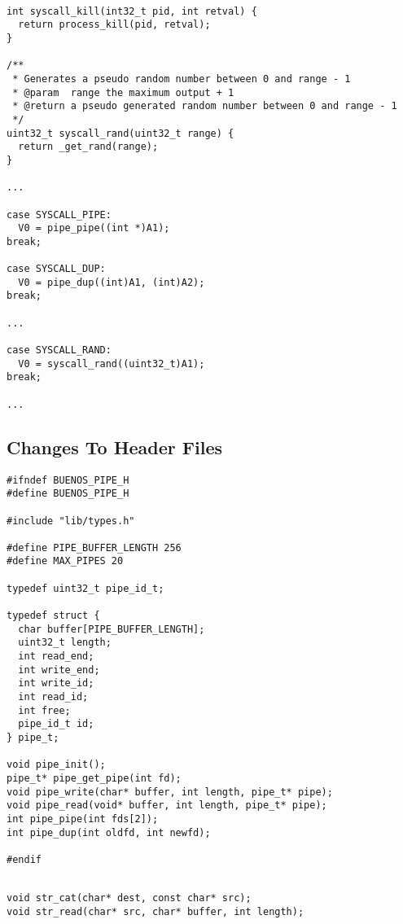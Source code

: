 \documentclass[12pt]{article}
\begin{document}
\begin{lstlisting}[caption=syscall.c]

int syscall_kill(int32_t pid, int retval) {
  return process_kill(pid, retval);
}

/**
 * Generates a pseudo random number between 0 and range - 1
 * @param  range the maximum output + 1
 * @return a pseudo generated random number between 0 and range - 1
 */
uint32_t syscall_rand(uint32_t range) {
  return _get_rand(range);
}

...

case SYSCALL_PIPE:
  V0 = pipe_pipe((int *)A1);
break;

case SYSCALL_DUP:
  V0 = pipe_dup((int)A1, (int)A2);
break;

...

case SYSCALL_RAND:
  V0 = syscall_rand((uint32_t)A1);
break;

...

\end{lstlisting}

\newpage 

\subsection{Changes To Header Files}

\begin{lstlisting}[caption=pipe.h]
#ifndef BUENOS_PIPE_H
#define BUENOS_PIPE_H

#include "lib/types.h"

#define PIPE_BUFFER_LENGTH 256
#define MAX_PIPES 20

typedef uint32_t pipe_id_t;

typedef struct {
  char buffer[PIPE_BUFFER_LENGTH];
  uint32_t length;
  int read_end;
  int write_end;
  int write_id;
  int read_id;
  int free;
  pipe_id_t id;
} pipe_t;

void pipe_init();
pipe_t* pipe_get_pipe(int fd);
void pipe_write(char* buffer, int length, pipe_t* pipe);
void pipe_read(void* buffer, int length, pipe_t* pipe);
int pipe_pipe(int fds[2]);
int pipe_dup(int oldfd, int newfd);

#endif

\end{lstlisting}

\begin{lstlisting}[caption=libc.h]

void str_cat(char* dest, const char* src);
void str_read(char* src, char* buffer, int length);

\end{lstlisting}
\end{document}
